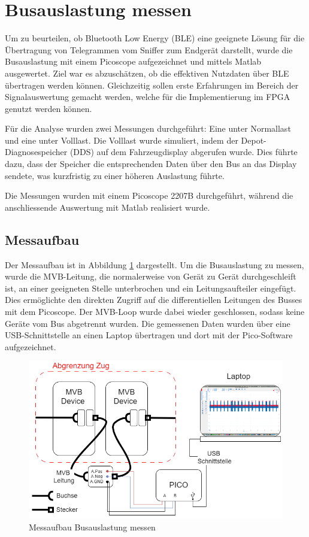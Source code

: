 \section{Busauslastung messen}
Um zu beurteilen, ob Bluetooth Low Energy (BLE) eine geeignete Lösung für die Übertragung von Telegrammen vom Sniffer zum Endgerät darstellt, wurde die Busauslastung mit einem Picoscope aufgezeichnet und mittels Matlab ausgewertet. Ziel war es abzuschätzen, ob die effektiven Nutzdaten über BLE übertragen werden können. Gleichzeitig sollen erste Erfahrungen im Bereich der Signalauswertung gemacht werden, welche für die Implementierung im FPGA genutzt werden können.

Für die Analyse wurden zwei Messungen durchgeführt: Eine unter Normallast und eine unter Volllast. Die Volllast wurde simuliert, indem der Depot-Diagnosespeicher (DDS) auf dem Fahrzeugdisplay abgerufen wurde. Dies führte dazu, dass der Speicher die entsprechenden Daten über den Bus an das Display sendete, was kurzfristig zu einer höheren Auslastung führte.

Die Messungen wurden mit einem Picoscope 2207B durchgeführt, während die anschliessende Auswertung mit Matlab realisiert wurde.

\subsection{Messaufbau}

Der Messaufbau ist in Abbildung \ref{fig:MessaufbauBusauslastungMessen} dargestellt. Um die Busauslastung zu messen, wurde die MVB-Leitung, die normalerweise von Gerät zu Gerät durchgeschleift ist, an einer geeigneten Stelle unterbrochen und ein Leitungsaufteiler eingefügt. Dies ermöglichte den direkten Zugriff auf die differentiellen Leitungen des Busses mit dem Picoscope. Der MVB-Loop wurde dabei wieder geschlossen, sodass keine Geräte vom Bus abgetrennt wurden. Die gemessenen Daten wurden über eine USB-Schnittstelle an einen Laptop übertragen und dort mit der Pico-Software aufgezeichnet.

\begin{figure}[H]
    \centering
    \includegraphics[width=0.8\linewidth]{Figures/Chap3/Busauslastung/Messaufbau_PICO_IC2000.png}
    \caption{Messaufbau Busauslastung messen}
    \label{fig:MessaufbauBusauslastungMessen}
\end{figure}

